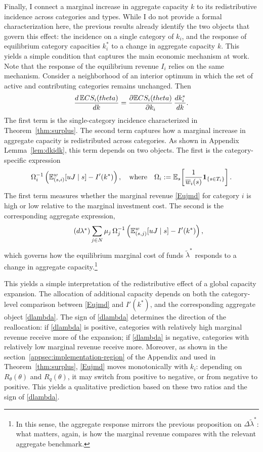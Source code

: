 \documentclass{class}
\begin{document}
Finally, I connect a marginal increase in aggregate capacity \(k\) to its redistributive incidence across categories and types. While I do not provide a formal characterization here, the previous results already identify the two objects that govern this effect: the incidence on a single category of \(k_i\), and the response of equilibrium category capacities \(k_i^\ast\) to a change in aggregate capacity \(k\). This yields a simple condition that captures the main economic mechanism at work. Note that the response of the equilibrium revenue $I_i$ relies on the same mechanism. Consider a neighborhood of an interior optimum in which the set of active and contributing categories remains unchanged. Then
\[
\frac{d\,\mathbb{E} CS_i(theta)}{dk}
=
\frac{\partial \mathbb{E} CS_i(theta)}{\partial k_i}\,
\frac{dk_i^\ast}{dk}.
\]
The first term is the single-category incidence characterized in Theorem~\ref{thm:surplus}. The second term captures how a marginal increase in aggregate capacity is redistributed across categories. As shown in Appendix Lemma~\ref{lem:dkidk}, this term depends on two objects. The first is the category-specific expression
\[
\Omega_i^{-1}\left(
\mathbb{E}_{(s,i)}^w[uJ\mid s]
-I'(k^\ast)
\right), \quad \text{where} \quad \Omega_i
:=
\mathbb{E}_s\!\left[\frac{1}{\overline w_i(s)}\mathbf 1_{\{s\in T_i\}}\right].
\]
The first term measures whether the marginal revenue \ref{Eujmd} for category \(i\) is high or low relative to the marginal investment cost. The second is the corresponding aggregate expression,
\[\tag{$d\lambda^\ast$}\label{dlambda}
\sum_{j\in N } \mu_j\,\Omega_j^{-1}
\left(
\mathbb{E}_{(s,j)}^w[uJ\mid s]
-I'(k^\ast)
\right),
\]
which governs how the equilibrium marginal cost of funds \(\tilde\lambda^\ast\) responds to a change in aggregate capacity.\footnote{In this sense, the aggregate response mirrors the previous proposition on \(\Delta\tilde\lambda^\ast\): what matters, again, is how the marginal revenue compares with the relevant aggregate benchmark.}

This yields a simple interpretation of the redistributive effect of a global capacity expansion. The allocation of additional capacity depends on both the category-level comparison between \ref{Eujmd} and \(I'(k^\ast)\), and the corresponding aggregate object \ref{dlambda}. The sign of \ref{dlambda} determines the direction of the reallocation: if \ref{dlambda} is positive, categories with relatively high marginal revenue receive more of the expansion; if \ref{dlambda} is negative, categories with relatively low marginal revenue receive more. Moreover, as shown in the section~\ref{appsec:implementation-region} of the Appendix and used in Theorem~\ref{thm:surplus}, \ref{Eujmd} moves monotonically with \(k_i\): depending on \(R_\theta(\theta)\) and \(R_q(\theta)\), it may switch from positive to negative, or from negative to positive. This yields a qualitative prediction based on these two ratios and the sign of \ref{dlambda}.
\end{document}
